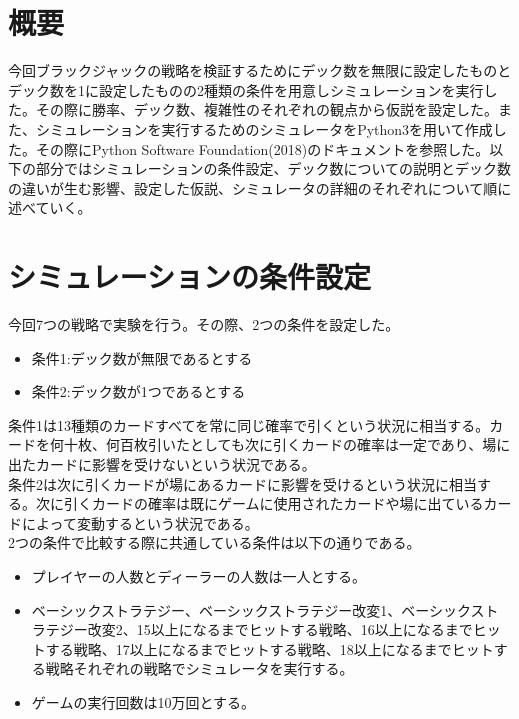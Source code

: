 \section{概要}
今回ブラックジャックの戦略を検証するためにデック数を無限に設定したものとデック数を1に設定したものの2種類の条件を用意しシミュレーションを実行した。その際に勝率、デック数、複雑性のそれぞれの観点から仮説を設定した。また、シミュレーションを実行するためのシミュレータをPython3を用いて作成した。その際にPython Software Foundation(2018)のドキュメントを参照した。以下の部分ではシミュレーションの条件設定、デック数についての説明とデック数の違いが生む影響、設定した仮説、シミュレータの詳細のそれぞれについて順に述べていく。


\section{シミュレーションの条件設定}
今回7つの戦略で実験を行う。その際、2つの条件を設定した。
\begin{itemize}
\item 条件1:デック数が無限であるとする
\item 条件2:デック数が1つであるとする
\end{itemize}
条件1は13種類のカードすべてを常に同じ確率で引くという状況に相当する。カードを何十枚、何百枚引いたとしても次に引くカードの確率は一定であり、場に出たカードに影響を受けないという状況である。\\
条件2は次に引くカードが場にあるカードに影響を受けるという状況に相当する。次に引くカードの確率は既にゲームに使用されたカードや場に出ているカードによって変動するという状況である。\\
2つの条件で比較する際に共通している条件は以下の通りである。
\begin{itemize}
\item プレイヤーの人数とディーラーの人数は一人とする。
\item ベーシックストラテジー、ベーシックストラテジー改変1、ベーシックストラテジー改変2、15以上になるまでヒットする戦略、16以上になるまでヒットする戦略、17以上になるまでヒットする戦略、18以上になるまでヒットする戦略それぞれの戦略でシミュレータを実行する。
\item ゲームの実行回数は10万回とする。
\end{itemize}

